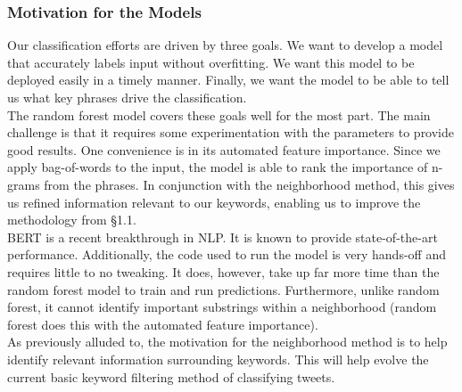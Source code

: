 \documentclass[12pt, a4paper]{article}
\begin{document}
\subsubsection{Motivation for the Models}
Our classification efforts are driven by three goals. We want to develop a model that accurately labels input without overfitting. We want this model to be deployed easily in a timely manner. Finally, we want the model to be able to tell us what key phrases drive the classification.\\

The random forest model covers these goals well for the most part. The main challenge is that it requires some experimentation with the parameters to provide good results. One convenience is in its automated feature importance. Since we apply bag-of-words to the input, the model is able to rank the importance of n-grams from the phrases. In conjunction with the neighborhood method, this gives us refined information relevant to our keywords, enabling us to improve the methodology from \S 1.1.\\

BERT is a recent breakthrough in NLP. It is known to provide state-of-the-art performance. Additionally, the code used to run the model is very hands-off and requires little to no tweaking. It does, however, take up far more time than the random forest model to train and run predictions. Furthermore, unlike random forest, it cannot identify important substrings within a neighborhood (random forest does this with the automated feature importance).\\

As previously alluded to, the motivation for the neighborhood method is to help identify relevant information surrounding keywords. This will help evolve the current basic keyword filtering method of classifying tweets.
\end{document}

